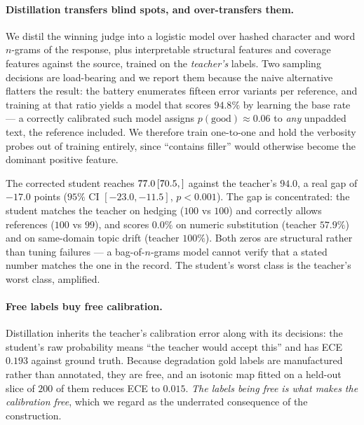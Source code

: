 \documentclass[10pt,letterpaper]{article}
\newcommand{\ci}[3]{\,[#1,\,#3]}
\begin{document}
\paragraph{Distillation transfers blind spots, and over-transfers them.}
We distil the winning judge \cite{hinton2015distilling} into a logistic model over hashed character
and word $n$-grams of the response, plus interpretable structural features and coverage features
against the source, trained on the \emph{teacher's} labels. Two sampling decisions are load-bearing
and we report them because the naive alternative flatters the result: the battery enumerates fifteen
error variants per reference, and training at that ratio yields a model that scores $94.8\%$ by
learning the base rate --- a correctly calibrated such model assigns $p(\text{good}) \approx 0.06$ to
\emph{any} unpadded text, the reference included. We therefore train one-to-one and hold the
verbosity probes out of training entirely, since ``contains filler'' would otherwise become the
dominant positive feature.

The corrected student reaches $77.0\ci{70.5}{82.5}$ against the teacher's $94.0$, a real gap of
$-17.0$ points ($95\%$ CI $[-23.0, -11.5]$, $p < 0.001$). The gap is concentrated: the student
matches the teacher on hedging ($100$ vs $100$) and correctly allows references ($100$ vs $99$),
and scores $0.0\%$ on numeric substitution (teacher $57.9\%$) and on same-domain topic drift
(teacher $100\%$). Both zeros are structural rather than tuning failures --- a bag-of-$n$-grams
model cannot verify that a stated number matches the one in the record. The student's worst class is
the teacher's worst class, amplified.

\paragraph{Free labels buy free calibration.}
Distillation inherits the teacher's calibration error along with its decisions: the student's raw
probability means ``the teacher would accept this'' and has ECE $0.193$ against ground truth.
Because degradation gold labels are manufactured rather than annotated, they are free, and an
isotonic map \cite{zadrozny2002transforming} fitted on a held-out slice of $200$ of them reduces ECE
to $0.015$. \emph{The labels being free is what makes the calibration free}, which we regard as the
underrated consequence of the construction.
\end{document}
